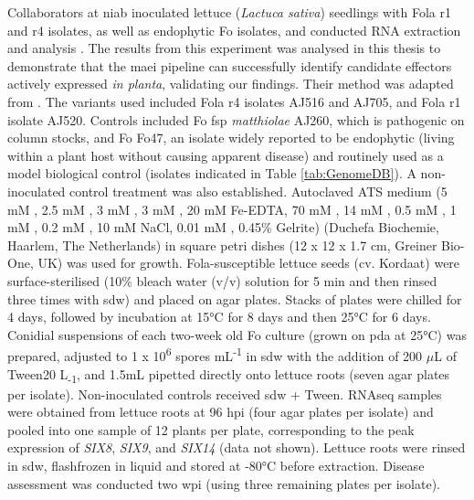 Collaborators at \ac{niab} inoculated lettuce (\textit{Lactuca sativa}) seedlings with \ac{Fola} \ac{r1} and \ac{r4} isolates, as well as endophytic \ac{Fo} isolates, and conducted RNA extraction and analysis \parencite{FolaManuscript}. The results from this experiment was analysed in this thesis to demonstrate that the \ac{maei} pipeline can successfully identify candidate effectors actively expressed \textit{in planta}, validating our findings. Their method was adapted from \textcite{Taylor2016}. The variants used included \ac{Fola} \ac{r4} isolates AJ516 and AJ705, and \ac{Fola} \ac{r1} isolate AJ520. Controls included \ac{Fo} \ac{fsp} \textit{matthiolae} AJ260, which is pathogenic on column stocks, and \ac{Fo} Fo47, an isolate widely reported to be endophytic (living within a plant host without causing apparent disease) and routinely used as a model biological control \parencite{alabouvette1986fusarium, rp1996suppression, lemanceau1993antagonistic, aime2013endophytic, constantin2019endophyte, de2021protection, iida2022biocontrol} (isolates indicated in Table \ref{tab:GenomeDB}). A non-inoculated control treatment was also established. Autoclaved ATS medium (5 mM , 2.5 mM , 3 mM , 3 mM , 20 mM Fe-EDTA, 70 mM , 14 mM , 0.5 mM , 1 mM , 0.2 mM , 10 mM NaCl, 0.01 mM , 0.45\% Gelrite) (Duchefa Biochemie, Haarlem, The Netherlands) in square petri dishes (12 x 12 x 1.7 cm, Greiner Bio-One, UK) was used for growth. \ac{Fola}-susceptible lettuce seeds (cv. Kordaat) were surface-sterilised (10\% bleach water (v/v) solution for 5 min and then rinsed three times with \ac{sdw}) and placed on agar plates. Stacks of plates were chilled for 4 days, followed by incubation at 15°C for 8 days and then 25°C for 6 days. Conidial suspensions of each two-week old \ac{Fo} culture (grown on \ac{pda} at 25°C) was prepared, adjusted to 1 x 10\textsuperscript{6} spores mL\textsuperscript{-1} in \ac{sdw} with the addition of 200 \(\mu\)L of Tween20 L\textsubscript{-1}, and 1.5mL pipetted directly onto lettuce roots (seven agar plates per isolate). Non-inoculated controls received \ac{sdw} + Tween. RNAseq samples were obtained from lettuce roots at 96 \ac{hpi} (four agar plates per isolate) and pooled into one sample of 12 plants per plate, corresponding to the peak expression of \textit{SIX8}, \textit{SIX9}, and \textit{SIX14} (data not shown). Lettuce roots were rinsed in \ac{sdw}, flashfrozen in liquid  and stored at -80°C before extraction. Disease assessment was conducted two \ac{wpi} (using three remaining plates per isolate).


